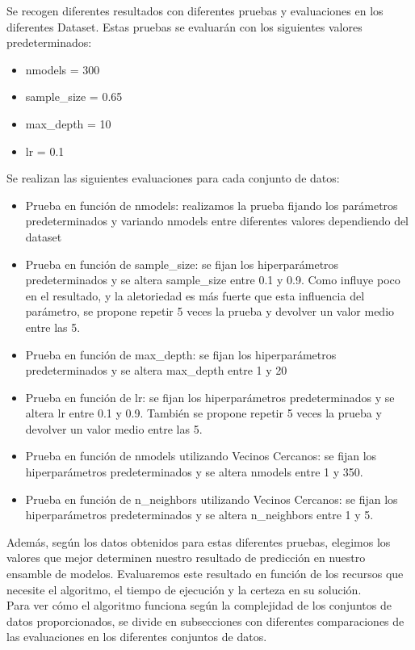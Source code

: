 \documentclass[conference,a4paper]{IEEEtran}
\begin{document}
Se recogen diferentes resultados con diferentes pruebas y evaluaciones en los diferentes Dataset. Estas pruebas se evaluarán con los siguientes valores predeterminados:
\begin{itemize}
    \item nmodels = 300
    \item sample\_size = 0.65
    \item max\_depth = 10
    \item lr = 0.1
\end{itemize}
Se realizan las siguientes evaluaciones para cada conjunto de datos: \\
\begin{itemize}
\item Prueba en función de nmodels: realizamos la prueba fijando los parámetros predeterminados y variando nmodels entre diferentes valores dependiendo del dataset
\item Prueba en función de sample\_size: se fijan los hiperparámetros predeterminados y se altera sample\_size entre 0.1 y 0.9. Como influye poco en el resultado, y la aletoriedad es más fuerte que esta influencia del parámetro, se propone repetir 5 veces la prueba y devolver un valor medio entre las 5.
\item Prueba en función de max\_depth: se fijan los hiperparámetros predeterminados y se altera max\_depth entre 1 y 20
\item Prueba en función de lr: se fijan los hiperparámetros predeterminados y se altera lr entre 0.1 y 0.9. También se propone repetir 5 veces la prueba y devolver un valor medio entre las 5.
\item Prueba en función de nmodels utilizando Vecinos Cercanos: se fijan los hiperparámetros predeterminados y se altera nmodels entre 1 y 350.
\item Prueba en función de n\_neighbors utilizando Vecinos Cercanos: se fijan los hiperparámetros predeterminados y se altera n\_neighbors entre 1 y 5.
\end{itemize}

Además, según los datos obtenidos para estas diferentes pruebas, elegimos los valores que mejor determinen nuestro resultado de predicción en nuestro ensamble de modelos. Evaluaremos este resultado en función de los recursos que necesite el algoritmo, el tiempo de ejecución y la certeza en su solución. \\

Para ver cómo el algoritmo funciona según la complejidad de los conjuntos de datos proporcionados, se divide en subsecciones con diferentes comparaciones de las evaluaciones en los diferentes conjuntos de datos.
\end{document}
